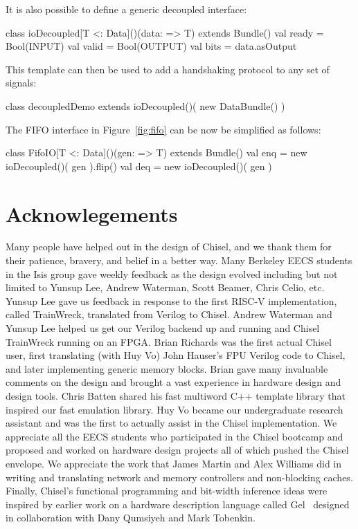 \documentclass[10pt]{article}
\begin{document}
It is also possible to define a generic decoupled interface:

\begin{scala}
  class ioDecoupled[T <: Data]()(data: => T) extends Bundle() {
    val ready = Bool(INPUT)
    val valid = Bool(OUTPUT)
    val bits  = data.asOutput
  }
\end{scala}

\noindent
This template can then be used to add a handshaking protocol to any
set of signals:

\begin{scala}
  class decoupledDemo extends ioDecoupled()( new DataBundle() )
\end{scala}

\noindent
The FIFO interface in Figure~\ref{fig:fifo} can be now be simplified as
follows: 

\begin{scala}
  class FifoIO[T <: Data]()(gen: => T) extends Bundle()  {
    val enq = new ioDecoupled()( gen ).flip()
    val deq = new ioDecoupled()( gen )
  }
\end{scala}


\section{Acknowlegements}

Many people have helped out in the design of Chisel, and we thank them
for their patience, bravery, and belief in a better way.  Many
Berkeley EECS students in the Isis group gave weekly feedback as the
design evolved including but not limited to Yunsup Lee, Andrew
Waterman, Scott Beamer, Chris Celio, etc.  Yunsup Lee gave us feedback
in response to the first RISC-V implementation, called TrainWreck,
translated from Verilog to Chisel.  Andrew Waterman and Yunsup Lee
helped us get our Verilog backend up and running and Chisel TrainWreck
running on an FPGA.  Brian Richards was the first actual Chisel user,
first translating (with Huy Vo) John Hauser's FPU Verilog code to
Chisel, and later implementing generic memory blocks.  Brian gave many
invaluable comments on the design and brought a vast experience in
hardware design and design tools.  Chris Batten shared his fast
multiword C++ template library that inspired our fast emulation
library.  Huy Vo became our undergraduate research assistant and was
the first to actually assist in the Chisel implementation.  We
appreciate all the EECS students who participated in the Chisel
bootcamp and proposed and worked on hardware design projects all of
which pushed the Chisel envelope.  We appreciate the work that James
Martin and Alex Williams did in writing and translating network and
memory controllers and non-blocking caches.  Finally, Chisel's
functional programming and bit-width inference ideas were inspired by
earlier work on a hardware description language called Gel~\cite{gel} designed in
collaboration with Dany Qumsiyeh and Mark Tobenkin.
\end{document}
